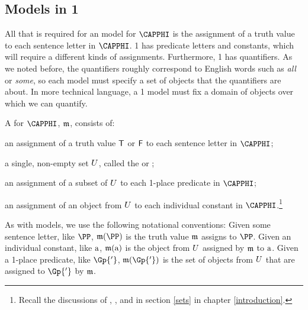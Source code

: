 \subsection{Models in \GQL{}1}\label{Interpretations in GQL1}
All that is required for an \GSL{} model for $\CAPPHI$ is the assignment of a truth value to each sentence letter in $\CAPPHI$. 
\GQL{}1 has predicate letters and constants, which will require a different kinds of assignments. 
Furthermore, \GQL{}1 has quantifiers.  As we noted before, the quantifiers roughly correspond to English words such as \emph{all} or \emph{some}, so each model must specify a set of objects that the quantifiers are about.  In more technical language, a \GQL{}1 model must fix a domain of objects over which we can quantify. 
\begin{majorILnc}{} 
A  for $\CAPPHI$, $\mathfrak{m}$, consists of:
\begin{cenumerate}
\item an assignment of a truth value $\mathsf{T}$ or $\mathsf{F}$ to each sentence letter in $\CAPPHI$; 
\item a single, non-empty set $U$, called the  or ;
\item an assignment of a subset of $U$ to each 1-place predicate in $\CAPPHI$;
\item an assignment of an object from $U$ to each individual constant in $\CAPPHI$.\footnote{Recall the discussions of , , and  in section \ref{sets} in chapter \ref{introduction}.}
\end{cenumerate}
\end{majorILnc}
\noindent{}As with \GSL{} models, we use the following notational conventions: 
Given some sentence letter, like $\PP$, $\IntA(\PP)$ is the truth value $\mathfrak{m}$ assigns to $\PP$.
Given an individual constant, like $\mathrm{a}$, $\mathfrak{m}(\mathrm{a})$ is the object from $U$ assigned by $\mathfrak{m}$ to $\mathrm{a}$. 
Given a 1-place predicate, like $\Gp{'}$, $\IntA(\Gp{'})$ is the set of objects from $U$ that are assigned to $\Gp{'}$ by $\mathfrak{m}$.%

